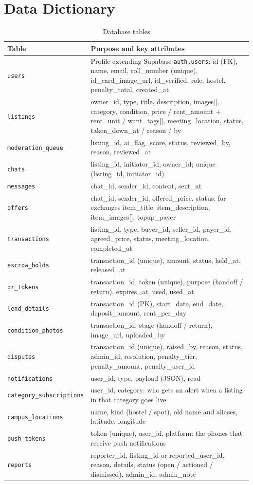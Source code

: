 \documentclass[11pt,a4paper]{scrreprt}
\begin{document}
\section{Data Dictionary}\label{sec:data}
\begin{longtable}{L{3.3cm} L{11.9cm}}
\caption{Database tables}\label{tab:data}\\
\toprule
\textbf{Table} & \textbf{Purpose and key attributes}\\ \midrule\endhead
\texttt{users} & Profile extending Supabase \texttt{auth.users}: id (FK), name, email, roll\_number (unique), id\_card\_image\_url, id\_verified, role, hostel, penalty\_total, created\_at\\
\texttt{listings} & owner\_id, type, title, description, images[], category, condition, price / rent\_amount + rent\_unit / want\_tags[], meeting\_location, status, taken\_down\_at / reason / by\\
\texttt{moderation_queue} & listing\_id, ai\_flag\_score, status, reviewed\_by, reason, reviewed\_at\\
\texttt{chats} & listing\_id, initiator\_id, owner\_id; unique (listing\_id, initiator\_id)\\
\texttt{messages} & chat\_id, sender\_id, content, sent\_at\\
\texttt{offers} & chat\_id, sender\_id, offered\_price, status; for exchanges item\_title, item\_description, item\_images[], topup\_payer\\
\texttt{transactions} & listing\_id, type, buyer\_id, seller\_id, payer\_id, agreed\_price, status, meeting\_location, completed\_at\\
\texttt{escrow_holds} & transaction\_id (unique), amount, status, held\_at, released\_at\\
\texttt{qr_tokens} & transaction\_id, token (unique), purpose (handoff / return), expires\_at, used, used\_at\\
\texttt{lend_details} & transaction\_id (PK), start\_date, end\_date, deposit\_amount, rent\_per\_day\\
\texttt{condition_photos} & transaction\_id, stage (handoff / return), image\_url, uploaded\_by\\
\texttt{disputes} & transaction\_id (unique), raised\_by, reason, status, admin\_id, resolution, penalty\_tier, penalty\_amount, penalty\_user\_id\\
\texttt{notifications} & user\_id, type, payload (JSON), read\\
\texttt{category_subscriptions} & user\_id, category: who gets an alert when a listing in that category goes live\\
\texttt{campus_locations} & name, kind (hostel / spot), old name and aliases, latitude, longitude\\
\texttt{push_tokens} & token (unique), user\_id, platform: the phones that receive push notifications\\
\texttt{reports} & reporter\_id, listing\_id or reported\_user\_id, reason, details, status (open / actioned / dismissed), admin\_id, admin\_note\\
\bottomrule
\end{longtable}
\end{document}
